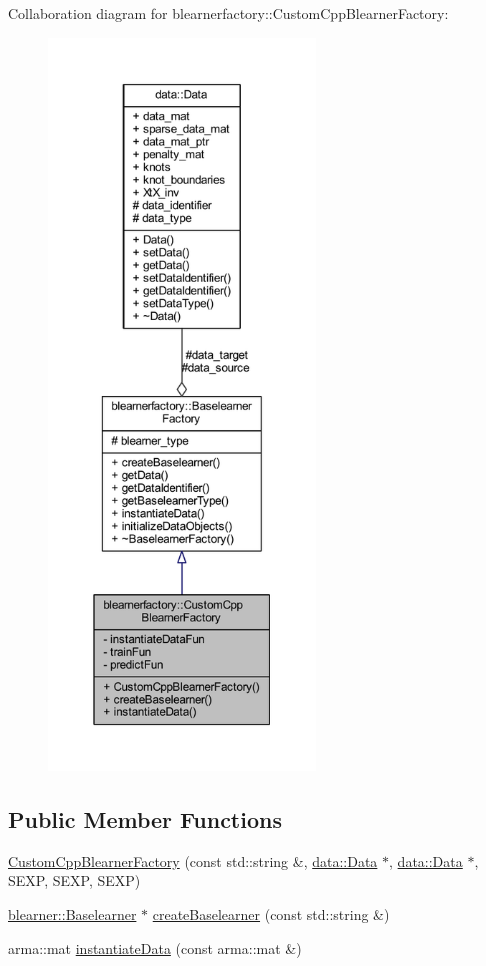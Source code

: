 Collaboration diagram for blearnerfactory\+:\+:Custom\+Cpp\+Blearner\+Factory\+:\nopagebreak
\begin{figure}[H]
\begin{center}
\leavevmode
\includegraphics[height=550pt]{classblearnerfactory_1_1_custom_cpp_blearner_factory__coll__graph}
\end{center}
\end{figure}
\subsection*{Public Member Functions}
\begin{DoxyCompactItemize}
\item 
\mbox{\hyperlink{classblearnerfactory_1_1_custom_cpp_blearner_factory_a390de0fb001434b3252e5f723c55d7b3}{Custom\+Cpp\+Blearner\+Factory}} (const std\+::string \&, \mbox{\hyperlink{classdata_1_1_data}{data\+::\+Data}} $\ast$, \mbox{\hyperlink{classdata_1_1_data}{data\+::\+Data}} $\ast$, S\+E\+XP, S\+E\+XP, S\+E\+XP)
\item 
\mbox{\hyperlink{classblearner_1_1_baselearner}{blearner\+::\+Baselearner}} $\ast$ \mbox{\hyperlink{classblearnerfactory_1_1_custom_cpp_blearner_factory_ac98fae043e6822605261c7c6f7125e8c}{create\+Baselearner}} (const std\+::string \&)
\item 
arma\+::mat \mbox{\hyperlink{classblearnerfactory_1_1_custom_cpp_blearner_factory_abc9c251017197087af3ef8a1c0421969}{instantiate\+Data}} (const arma\+::mat \&)
\end{DoxyCompactItemize}
